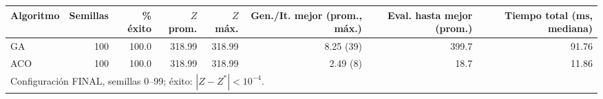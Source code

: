 \begin{tabular}{lrrrrrrr}
\toprule
Algoritmo & Semillas & \% éxito & $Z$ prom. & $Z$ máx. & Gen./It. mejor (prom., máx.) & Eval. hasta mejor (prom.) & Tiempo total (ms, mediana) \\
\midrule
GA & 100 & 100.0 & 318.99 & 318.99 & 8.25 (39) & 399.7 & 91.76 \\
ACO & 100 & 100.0 & 318.99 & 318.99 & 2.49 (8) & 18.7 & 11.86 \\
\midrule
\multicolumn{8}{l}{Configuración FINAL, semillas 0--99; éxito: $|Z - Z^*| < 10^{-4}$.} \\
\bottomrule
\end{tabular}
